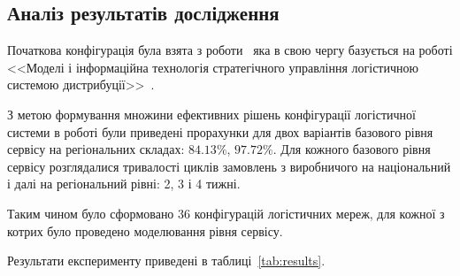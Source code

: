 \subsection{Аналіз результатів дослідження}
Початкова конфігурація була взята з роботи~\cite{Годлевський2019} яка в свою чергу базується на роботі <<Моделі і інформаційна технологія стратегічного управління логістичною системою дистрибуції>>~\cite{Stankevich}.

З метою формування множини ефективних рішень конфігурації логістичної системи в роботі були приведені прорахунки для двох варіантів базового рівня сервісу на регіональних складах: $84.13\%$, $97.72\%$. Для кожного базового рівня сервісу розглядалися тривалості циклів замовлень з виробничого на національний і далі на регіональний рівні: 2, 3 і 4 тижні.

Таким чином було сформовано 36 конфігурацій логістичних мереж, для кожної з котрих було проведено моделювання рівня сервісу.

Результати експерименту приведені в таблиці~\ref{tab:results}.

